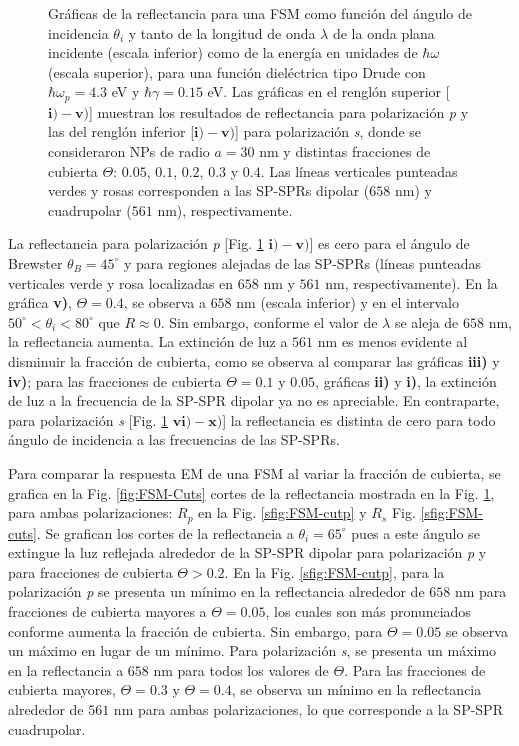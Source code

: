 \begin{figure}[h!]
\begin{tikzpicture}[scale=1]
\end{tikzpicture}\vspace*{-.75em}
	\caption{Gráficas de la reflectancia para una FSM como función del ángulo de incidencia $\theta_i$ y tanto de la longitud de onda $\lambda$ de la onda plana incidente (escala inferior) como de la energía en  unidades de $\hbar\omega$ (escala superior), para una función dieléctrica tipo Drude con $\hbar\omega_p=4. 3$ eV  y  $\hbar\gamma=0. 15$ eV.  Las gráficas   en el renglón superior [$\mathbf{i)-v)}$]  muestran los resultados de reflectancia para  polarización \emph{p} y las del renglón inferior  [$\mathbf{i)-v)}$] para polarización  \emph{s}, donde se consideraron NPs de radio $a=30$ nm y distintas fracciones de cubierta $\Theta$: $0. 05$, $0. 1$, $0. 2$, $0. 3$ y $0. 4$. Las líneas verticales punteadas verdes y rosas corresponden a las SP-SPRs dipolar ($658$ nm) y cuadrupolar ($561$ nm), respectivamente.}	\label{fig:R-FSM}	
	\end{figure}		
					
La reflectancia para polarización \emph{p} [Fig. \ref{fig:R-FSM} $\mathbf{i)-v)}$] es cero para el ángulo de Brewster $\theta_B = 45^\circ$ y para regiones alejadas de las SP-SPRs (líneas punteadas verticales verde y rosa  localizadas en $658$ nm y $561$ nm, respectivamente). En la gráfica \textbf{v)}, $\Theta=0.4$,  se observa a $658$ nm (escala inferior) y en el intervalo $50^\circ<\theta_i<80^\circ$ que $R\approx 0$. Sin embargo, conforme el valor de $\lambda$ se aleja de $658$ nm, la reflectancia aumenta. La extinción de luz a $561$ nm  es menos evidente al disminuir la fracción de cubierta, como se observa al comparar las gráficas \textbf{iii)} y \textbf{iv)}; para las fracciones de cubierta $\Theta=0.1$ y $0.05$, gráficas \textbf{ii)} y \textbf{i)}, la extinción de luz a la frecuencia de la SP-SPR dipolar  ya no es apreciable. En contraparte, para polarización \emph{s} [Fig. \ref{fig:R-FSM} $\mathbf{vi)-x)}$] la reflectancia es distinta de cero para todo ángulo de incidencia a las frecuencias de las SP-SPRs. 

Para comparar la respuesta EM de una FSM al variar la fracción de cubierta, se grafica en la Fig. \ref{fig:FSM-Cuts} cortes de la reflectancia mostrada en la Fig. \ref{fig:R-FSM}, para ambas polarizaciones: $R_p$ en la Fig. \ref{sfig:FSM-cutp} y  $R_s$ Fig. \ref{sfig:FSM-cuts}. Se grafican los cortes de la reflectancia a $\theta_i = 65^\circ$ pues a este ángulo se extingue la luz reflejada alrededor de la SP-SPR dipolar para polarización \emph{p} y para fracciones de cubierta $\Theta>0.2$. En la Fig. \ref{sfig:FSM-cutp}, para la polarización \emph{p} se presenta un mínimo en la reflectancia alrededor de $658$ nm para fracciones de cubierta mayores a $\Theta = 0.05$, los cuales son más pronunciados conforme aumenta la fracción de cubierta. Sin embargo, para $\Theta=0.05$ se observa un máximo en lugar de un mínimo. Para polarización \emph{s}, se presenta un máximo en la reflectancia a $658$ nm para todos los valores de $\Theta$. Para las fracciones de cubierta mayores, $\Theta = 0.3$ y $\Theta = 0.4$,  se observa un  mínimo en la reflectancia alrededor de $561$ nm para ambas polarizaciones, lo que corresponde a la SP-SPR cuadrupolar.

